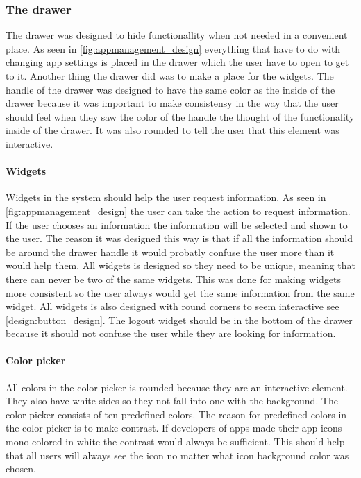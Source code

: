 \subsubsection{The drawer}
\label{sec:drawer}
The drawer was designed to hide functionallity when not needed in a convenient place. As seen in \autoref{fig:appmanagement_design} everything that have to do with changing app settings is placed in the drawer which the user have to open to get to it.
Another thing the drawer did was to make a place for the widgets.
The handle of the drawer was designed to have the same color as the inside of the drawer because it was important to make consistensy in the way that the user should feel when they saw the color of the handle the thought of the functionality inside of the drawer. It was also rounded to tell the user that this element was interactive.

\paragraph{Widgets}
\label{par:widgets}
Widgets in the \giraf[] system should help the user request information. As seen in \autoref{fig:appmanagement_design} the user can take the action to request information. If the user chooses an information the information will be selected and shown to the user.
The reason it was designed this way is that if all the information should be around the drawer handle it would probatly confuse the user more than it would help them.
All widgets is designed so they need to be unique, meaning that there can never be two of the same widgets. This was done for making widgets more consistent so the user always would get the same information from the same widget. All widgets is also designed with round corners to seem interactive see \autoref{design:button_design}.
The logout widget should be in the bottom of the drawer because it should not confuse the user while they are looking for information.

\paragraph{Color picker}
\label{par:colorpicker}
All colors in the color picker is rounded because they are an interactive element. They also have white sides so they not fall into one with the background. The color picker consists of ten predefined colors. The reason for predefined colors in the color picker is to make contrast. If developers of \giraf[] apps made their app icons mono-colored in white the contrast would always be sufficient. This should help that all users will always see the icon no matter what icon background color was chosen.